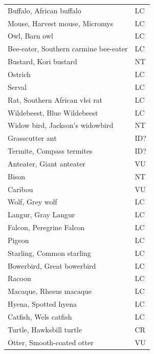 \documentclass[12pt,letterpaper]{article}
\begin{document}
\begin{center}
\begin{longtable}{ll}
Buffalo, African buffalo                        & LC          \\
Mouse, Harvest mouse, Micromys                  & LC          \\
Owl, Barn owl                                   & LC          \\
Bee-eater, Southern carmine bee-eater           & LC          \\
Bustard, Kori bustard                           & NT          \\
Ostrich                                         & LC          \\
Serval                                          & LC          \\
Rat, Southern African vlei rat                  & LC          \\
Wildebeest, Blue Wildebeest                     & LC          \\
Widow bird, Jackson's widowbird                 & NT          \\
Grasscutter ant                                 & ID?         \\
Termite, Compass termites                       & ID?         \\
Anteater, Giant anteater                        & VU          \\
Bison                                           & NT          \\
Caribou                                         & VU          \\
Wolf, Grey wolf                                 & LC          \\
Langur, Gray Langur                             & LC          \\
Falcon, Peregrine Falcon                        & LC          \\
Pigeon                                          & LC          \\
Starling, Common starling                       & LC          \\
Bowerbird, Great bowerbird                      & LC          \\
Racoon                                          & LC          \\
Macaque, Rhesus macaque                         & LC          \\
Hyena, Spotted hyena                            & LC          \\
Catfish, Wels catfish                           & LC          \\
Turtle, Hawksbill turtle                        & CR          \\
Otter, Smooth-coated otter                      & VU         
\end{longtable}
\end{center}
\end{document}
